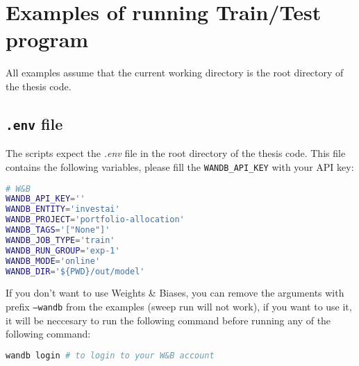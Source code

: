 \documentclass[../xlapes02]{subfiles}
\begin{document}
%
%


    \section{Examples of running Train/Test program}
    All examples assume that the current working directory is the root directory of the thesis code.

    \subsection{\texttt{.env} file}
    The scripts expect the \emph{.env} file in the root directory of the thesis code. This file contains the following variables, please fill the \texttt{WANDB\_API\_KEY} with your API key:
    \begin{lstlisting}[language=bash]
# W&B
WANDB_API_KEY=''
WANDB_ENTITY='investai'
WANDB_PROJECT='portfolio-allocation'
WANDB_TAGS='["None"]'
WANDB_JOB_TYPE='train'
WANDB_RUN_GROUP='exp-1'
WANDB_MODE='online'
WANDB_DIR='${PWD}/out/model'
    \end{lstlisting}
    If you don't want to use Weights \& Biases, you can remove the arguments with prefix \texttt{--wandb} from the examples (sweep run will not work), if you want to use it, it will be neccesary to run the following command before running any of the following command:
    \begin{lstlisting}[language=bash]
wandb login # to login to your W&B account
    \end{lstlisting}
\end{document}
